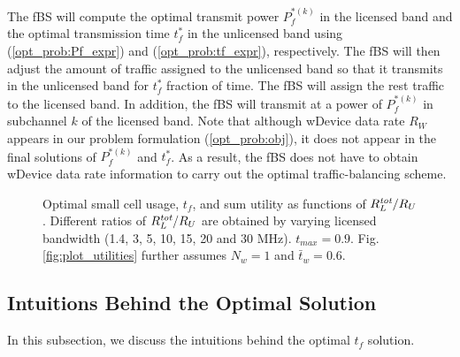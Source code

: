 \documentclass[journal,final,letterpaper,10pt,doublecolumn,twoside]{IEEEtran}
\begin{document}
The fBS will compute the optimal transmit power $P_f^{*(k)}$ in the licensed band and the optimal transmission time $t_f^*$ in the unlicensed band using (\ref{opt_prob:Pf_expr}) and (\ref{opt_prob:tf_expr}), respectively. The fBS will then adjust the amount of traffic assigned to the unlicensed band so that it transmits in the unlicensed band for $t_f^*$ fraction of time. The fBS will assign the rest traffic to the licensed band. In addition, the fBS will transmit at a power of $P_f^{*(k)}$  in subchannel $k$ of the licensed band.  Note that although wDevice data rate $R_W$ appears in our problem formulation (\ref{opt_prob:obj}), it does not appear in the final solutions of  $P_f^{*(k)}$ and $t_f^*$.
As a result, the fBS does not have to obtain wDevice data rate information to carry out the optimal traffic-balancing scheme.


\begin{figure*}[hpbt]
\centering {} \hfill
 \centering {}
\caption{ Optimal small cell usage, $t_f$, and sum utility as functions of $R^{\emph{tot}}_L/R_U$. Different ratios of $R^{\emph{tot}}_L/R_U$ are obtained by varying licensed bandwidth (1.4, 3, 5, 10, 15, 20 and 30 MHz). $t_{max}=0.9$. Fig. \ref{fig:plot_utilities} further assumes $N_w=1$ and $\bar{t}_w = 0.6$. } \label{fig:matlab_numerical_results}
\end{figure*}



\subsection{Intuitions Behind the Optimal Solution} \label{subsec:intuitions}
In this subsection, we discuss the intuitions behind the optimal $t_f$ solution.
\end{document}

